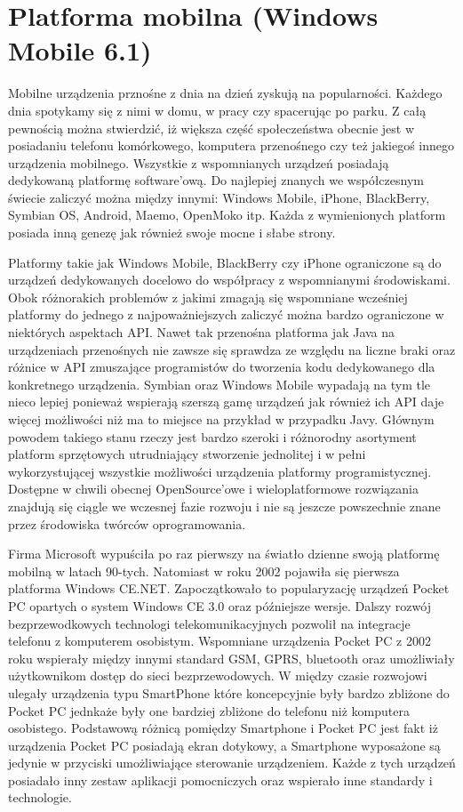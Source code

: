 \section{Platforma mobilna (Windows Mobile 6.1)}

Mobilne urządzenia prznośne z dnia na dzień zyskują na popularności. Każdego dnia
spotykamy się z nimi w domu, w pracy czy spacerując po parku. Z całą pewnością
można stwierdzić, iż większa część społeczeństwa obecnie jest w posiadaniu
telefonu komórkowego, komputera przenośnego czy też jakiegoś innego urządzenia
mobilnego. Wszystkie z wspomnianych urządzeń posiadają dedykowaną platformę
software'ową. Do najlepiej znanych we współczesnym świecie zaliczyć można między
innymi: Windows Mobile, iPhone, BlackBerry, Symbian OS, Android, Maemo, OpenMoko
itp. Każda z wymienionych platform posiada inną genezę jak również swoje mocne i
słabe strony.

Platformy takie jak Windows Mobile, BlackBerry czy iPhone ograniczone są do
urządzeń dedykowanych docelowo do współpracy z wspomnianymi środowiskami. Obok
różnorakich problemów z jakimi zmagają się wspomniane wcześniej platformy do
jednego z najpoważniejszych zaliczyć można bardzo ograniczone w niektórych
aspektach API. Nawet tak przenośna platforma jak Java na urządzeniach przenośnych
nie zawsze się sprawdza ze względu na liczne braki oraz różnice w API zmuszające
programistów do tworzenia kodu dedykowanego dla konkretnego urządzenia. Symbian
oraz Windows Mobile wypadają na tym tle nieco lepiej ponieważ wspierają szerszą
gamę urządzeń jak również ich API daje więcej możliwości niż ma to miejsce na
przykład w przypadku Javy. Głównym powodem takiego stanu rzeczy jest bardzo
szeroki i różnorodny asortyment platform sprzętowych utrudniający stworzenie
jednolitej i w pełni wykorzystującej wszystkie możliwości urządzenia platformy
programistycznej. Dostępne w chwili obecnej OpenSource'owe i wieloplatformowe
rozwiązania znajdują się ciągle we wczesnej fazie rozwoju i nie są jeszcze
powszechnie znane przez środowiska twórców oprogramowania.

Firma Microsoft wypuściła po raz pierwszy na światło dzienne swoją platformę
mobilną w latach 90-tych. Natomiast w roku 2002 pojawiła się pierwsza platforma
Windows CE.NET. Zapoczątkowało to popularyzację urządzeń Pocket PC opartych o
system Windows CE 3.0 oraz późniejsze wersje. Dalszy rozwój bezprzewodkowych
technologi telekomunikacyjnych pozwolił na integracje telefonu z komputerem
osobistym. Wspomniane urządzenia Pocket PC z 2002 roku wspierały między innymi
standard GSM, GPRS, bluetooth oraz umożliwiały użytkownikom dostęp do sieci
bezprzewodowych. W między czasie rozwojowi ulegały urządzenia typu SmartPhone
które koncepcyjnie były bardzo zbliżone do Pocket PC jednkaże były one bardziej
zbliżone do telefonu niż komputera osobistego. Podstawową różnicą pomiędzy
Smartphone i Pocket PC jest fakt iż urządzenia Pocket PC posiadają ekran
dotykowy, a Smartphone wyposażone są jedynie w przyciski umożliwiające sterowanie
urządzeniem. Każde z tych urządzeń posiadało inny zestaw aplikacji pomocniczych
oraz wspierało inne standardy i technologie.

